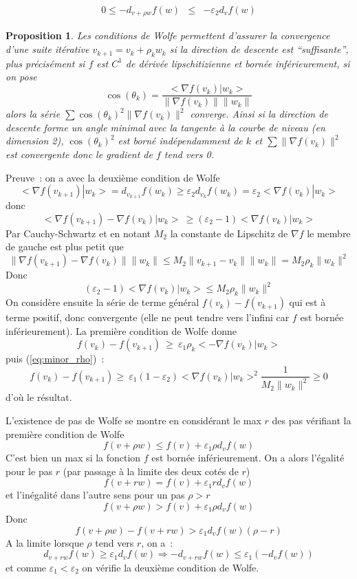 \documentclass[a4paper,11pt]{article}
\newtheorem{prop}[thm]{Proposition}
\begin{document}
\begin{giacjshere}
\begin{itemize}
\begin{eqnarray*}
0 \leq -d_{v+\rho w}f(w) &\leq& -\varepsilon_2 d_vf(w)
\end{eqnarray*}
\end{itemize}
\begin{prop}
Les conditions de Wolfe permettent d'assurer la convergence d'une
suite it\'erative $v_{k+1}=v_k+\rho_k w_k$ si la direction de descente
est ``suffisante'', plus pr\'ecis\'ement si $f$ est $C^1$ de d\'eriv\'ee
lipschitizienne et born\'ee inf\'erieurement, si on pose
$$ \cos(\theta_k)=\frac{<\nabla f(v_k)|w_k>}{\| \nabla f(v_k)\| \|w_k\|}$$
alors la s\'erie
$ \sum \cos(\theta_k)^2 \| \nabla f(v_k)\|^2 $ converge.
Ainsi si la direction de descente forme un angle minimal avec la
tangente \`a la courbe de niveau (en dimension 2), $\cos(\theta_k)^2$
est born\'e ind\'ependamment de $k$ et $\sum \|  \nabla f(v_k)\|^2$
est convergente donc le gradient de $f$ tend vers 0.
\end{prop}
Preuve~: on a avec la deuxi\`eme condition de Wolfe
$$ <\nabla f(v_{k+1})|w_k>=d_{v_{k+1}}f(w_k) 
\geq \varepsilon_2 d_{v_k}f(w_k)= \varepsilon_2<\nabla f(v_k)|w_k>$$
donc
$$ <\nabla f(v_{k+1})-\nabla f(v_k)|w_k> \ \geq (\varepsilon_2-1) <\nabla f(v_k)|w_k>$$
Par Cauchy-Schwartz et en notant $M_2$ la constante de Lipschitz de $\nabla f$
le membre de gauche est plus petit que 
$$ \| \nabla f(v_{k+1})-\nabla f(v_k) \| \| w_k \| \leq 
M_2\|v_{k+1}-v_k\| \| w_k\| = M_2 \rho_k \| w_k \|^2$$
Donc
\begin{equation} \label{eq:minor_rho}
 (\varepsilon_2-1)<\nabla f(v_k)|w_k> \leq M_2 \rho_k \| w_k \|^2
\end{equation}
On consid\`ere ensuite la s\'erie de terme g\'en\'eral
$f(v_{k})-f(v_{k+1})$  qui est \`a terme positif, donc convergente
(elle ne peut tendre vers l'infini car $f$ est born\'ee
inf\'erieurement).
La premi\`ere condition de Wolfe donne
$$ f(v_{k})-f(v_{k+1})  \ \geq  \ \varepsilon_1 \rho_k <-\nabla
f(v_k)|w_k> $$
puis (\ref{eq:minor_rho})~:
$$ f(v_{k})-f(v_{k+1})  \geq \ 
\varepsilon_1  (1-\varepsilon_2)<\nabla f(v_k)|w_k>^2\frac{1}{M_2  \|  w_k \|^2} 
 \geq 0 $$
d'o\`u le r\'esultat.

L'existence de pas de Wolfe se montre en consid\'erant le max $r$ des
pas v\'erifiant la premi\`ere condition de Wolfe
$$f(v+\rho w) \leq f(v) +\varepsilon_1 \rho d_vf(w) $$
C'est bien un max si la fonction
$f$ est born\'ee inf\'erieurement. On a alors l'\'egalit\'e pour le pas
$r$ (par passage \`a la limite des deux cot\'es de $r$)
$$f(v+r w) = f(v) +\varepsilon_1 r d_vf(w) $$
et l'in\'egalit\'e dans l'autre sens pour un pas $\rho>r$
$$f(v+\rho w) > f(v) +\varepsilon_1 \rho d_vf(w) $$
Donc
$$ f(v+\rho w)-f(v+r w) > \varepsilon_1 d_vf(w) (\rho -r)$$
A la limite lorsque $\rho$ tend vers $r$, on a~:
$$ d_{v+rw}f(w) \geq \varepsilon_1 d_vf(w) \Rightarrow -d_{v+rw}f(w) \leq \varepsilon_1 (-d_vf(w))$$
et comme $\varepsilon_1<\varepsilon_2$ on v\'erifie la deuxi\`eme
condition de Wolfe.


\end{giacjshere}
\end{document}
